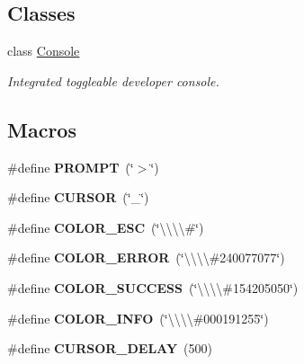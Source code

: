 \subsection*{Classes}
\begin{DoxyCompactItemize}
\item 
class \hyperlink{classConsole}{Console}
\begin{DoxyCompactList}\small\item\em Integrated toggleable developer console. \end{DoxyCompactList}\end{DoxyCompactItemize}
\subsection*{Macros}
\begin{DoxyCompactItemize}
\item 
\#define {\bfseries P\+R\+O\+M\+PT}~(\char`\"{}$>$\char`\"{})\hypertarget{Console_8hh_accdbea14ea06c15e271784368bd993e8}{}\label{Console_8hh_accdbea14ea06c15e271784368bd993e8}

\item 
\#define {\bfseries C\+U\+R\+S\+OR}~(\char`\"{}\+\_\+\char`\"{})\hypertarget{Console_8hh_ae67dffdc8e496c16aff7e8903a3f2117}{}\label{Console_8hh_ae67dffdc8e496c16aff7e8903a3f2117}

\item 
\#define {\bfseries C\+O\+L\+O\+R\+\_\+\+E\+SC}~(\char`\"{}\textbackslash{}\textbackslash{}\textbackslash{}\textbackslash{}\#\char`\"{})\hypertarget{Console_8hh_ad35272f2bff654b0397a96776e9fc8b4}{}\label{Console_8hh_ad35272f2bff654b0397a96776e9fc8b4}

\item 
\#define {\bfseries C\+O\+L\+O\+R\+\_\+\+E\+R\+R\+OR}~(\char`\"{}\textbackslash{}\textbackslash{}\textbackslash{}\textbackslash{}\#240077077\char`\"{})\hypertarget{Console_8hh_ac7bab6591a09366d23b86d710ecc54af}{}\label{Console_8hh_ac7bab6591a09366d23b86d710ecc54af}

\item 
\#define {\bfseries C\+O\+L\+O\+R\+\_\+\+S\+U\+C\+C\+E\+SS}~(\char`\"{}\textbackslash{}\textbackslash{}\textbackslash{}\textbackslash{}\#154205050\char`\"{})\hypertarget{Console_8hh_a49ad0d2196700c1fa0a3a2a60dad41d3}{}\label{Console_8hh_a49ad0d2196700c1fa0a3a2a60dad41d3}

\item 
\#define {\bfseries C\+O\+L\+O\+R\+\_\+\+I\+N\+FO}~(\char`\"{}\textbackslash{}\textbackslash{}\textbackslash{}\textbackslash{}\#000191255\char`\"{})\hypertarget{Console_8hh_a0d4d3a685f9501631d1feed1f4ba7577}{}\label{Console_8hh_a0d4d3a685f9501631d1feed1f4ba7577}

\item 
\#define {\bfseries C\+U\+R\+S\+O\+R\+\_\+\+D\+E\+L\+AY}~(500)\hypertarget{Console_8hh_a59178e92910e3e77a4714bb1ced95909}{}\label{Console_8hh_a59178e92910e3e77a4714bb1ced95909}

\end{DoxyCompactItemize}
